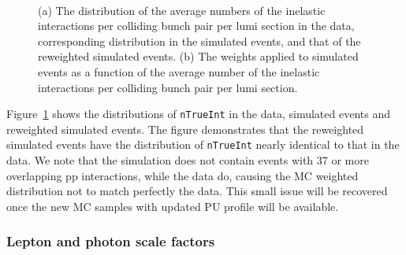 \begin{figure}[h!]
  \centering
   ~
  \caption{(a) The distribution of the average numbers of the
    inelastic interactions per colliding bunch pair per lumi section
    in the data, corresponding distribution in the simulated events,
    and that of the reweighted simulated events. (b) The weights
    applied to simulated events as a function of the average number of
    the inelastic interactions per colliding bunch pair per lumi
    section.}
  \label{f044_corr_nTrueInt_data_mc_norm}
\end{figure}

Figure~\ref{f044_corr_nTrueInt_data_mc_norm} shows the distributions
of \verb!nTrueInt! in the data, simulated events and reweighted
simulated events. The figure demonstrates that the reweighted
simulated events have the distribution of \verb!nTrueInt! nearly
identical to that in the data. 
We note that the simulation does not contain events with 37 or more
overlapping pp interactions, while the data do, causing the MC
weighted distribution not to match perfectly the data. This small
issue will be recovered once the new MC samples with updated PU
profile will be available.

\subsubsection{Lepton and photon scale factors}


